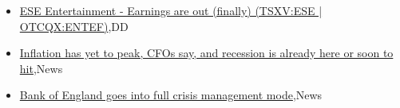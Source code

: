 \documentclass{article}%
\begin{document}
%
\begin{itemize}%
\item%
\href{https://reddit.com/r/Baystreetbets/comments/xr7w59/ese\_entertainment\_earnings\_are\_out\_finally/}{ESE Entertainment - Earnings are out (finally) (TSXV:ESE | OTCQX:ENTEF)},DD%
\item%
\href{https://reddit.com/r/Economics/comments/xr6if5/inflation\_has\_yet\_to\_peak\_cfos\_say\_and\_recession/}{Inflation has yet to peak, CFOs say, and recession is already here or soon to hit},News%
\item%
\href{https://reddit.com/r/Economics/comments/xr5tbu/bank\_of\_england\_goes\_into\_full\_crisis\_management/}{Bank of England goes into full crisis management mode},News%
\end{itemize}%
\end{document}
